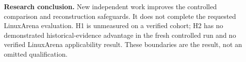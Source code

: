 \documentclass[10pt,letterpaper]{article}
\begin{document}
\textbf{Research conclusion.} New independent work improves the controlled comparison and reconstruction safeguards. It does not complete the requested LinuxArena evaluation. H1 is unmeasured on a verified cohort; H2 has no demonstrated historical-evidence advantage in the fresh controlled run and no verified LinuxArena applicability result. These boundaries are the result, not an omitted qualification.
\end{document}
